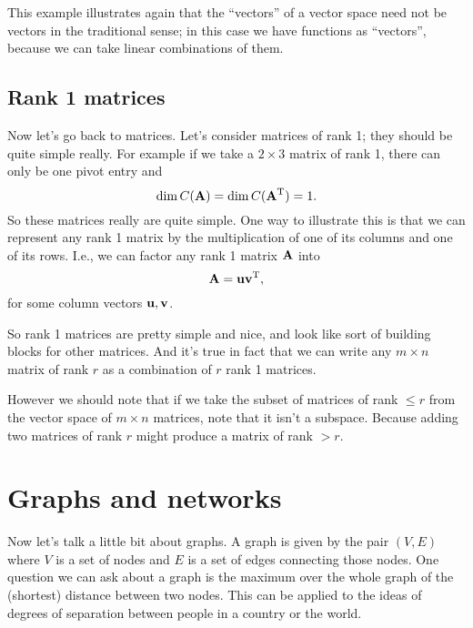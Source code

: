 This example illustrates again that the ``vectors'' of a vector space need not be vectors in the traditional sense; in this case we have functions as ``vectors'', because we can take linear combinations of them. 

\subsection{Rank 1 matrices}

Now let's go back to matrices. Let's consider matrices of rank 1; they should be quite simple really. For example if we take a $2 \times 3$ matrix of rank 1, there can only be one pivot entry and 
\[ \mathrm{dim}\, C(\boldsymbol{\mathbf{A}}) = \mathrm{dim}\, C(\boldsymbol{\mathbf{A}}^\mathrm{T}) = 1. \]
So these matrices really are quite simple. One way to illustrate this is that we can represent any rank 1 matrix by the multiplication of one of its columns and one of its rows. I.e., we can factor any rank 1 matrix $\boldsymbol{\mathbf{A}}$ into
\[ \boldsymbol{\mathbf{A}} = \boldsymbol{\mathbf{u}} \boldsymbol{\mathbf{v}}^\mathrm{T}, \]
for some column vectors $\boldsymbol{\mathbf{u}},\boldsymbol{\mathbf{v}}$.

So rank 1 matrices are pretty simple and nice, and look like sort of building blocks for other matrices. And it's true in fact that we can write any $m \times n$ matrix of rank $r$ as a combination of $r$ rank 1 matrices.

However we should note that if we take the subset of matrices of rank $\le r$ from the vector space of $m \times n$ matrices, note that it isn't a subspace. Because adding two matrices of rank $r$ might produce a matrix of rank $> r$. 

\section{Graphs and networks}

Now let's talk a little bit about graphs.
\bdf
A graph is given by the pair $(V,E)$ where $V$ is a set of nodes and $E$ is a set of edges connecting those nodes. 
\edf
One question we can ask about a graph is the maximum over the whole graph of the (shortest) distance between two nodes. This can be applied to the ideas of degrees of separation between people in a country or the world. 